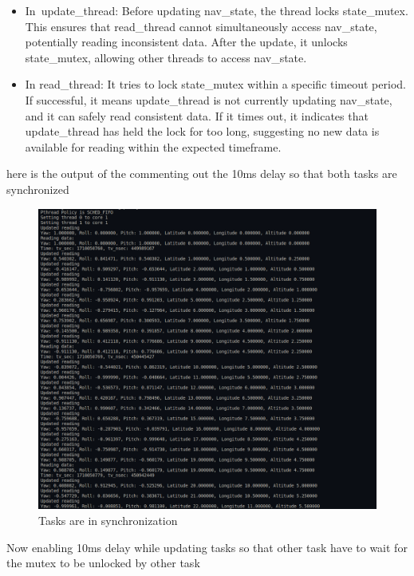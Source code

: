 \documentclass[a4paper,11pt]{article}%
\newenvironment{qanda}{\setlength{\parindent}{0pt}}{\bigskip}
\begin{document}
\begin{qanda}
\begin{enumerate}
\begin{enumerate}
\begin{itemize}
	\item In\ update\_thread: Before updating nav\_state, the thread locks state\_mutex. This ensures that read\_thread cannot simultaneously access nav\_state, potentially reading inconsistent data. After the update, it unlocks state\_mutex, allowing other threads to access nav\_state.
	\item 
	In read\_thread: It tries to lock state\_mutex within a specific timeout period. If successful, it means update\_thread is not currently updating nav\_state, and it can safely read consistent data. If it times out, it indicates that update\_thread has held the lock for too long, suggesting no new data is available for reading within the expected timeframe.	
\end{itemize}



here is the output of the commenting out the 10ms delay so that both tasks are synchronized

\begin{figure}[H]
	\centering
	\includegraphics[scale=0.6]{figures/pthread_working.png}
	\caption{Tasks are in synchronization}
\end{figure}


Now enabling 10ms delay while updating tasks so that other task have to wait for the mutex to be unlocked by other task


\end{enumerate}
\end{enumerate}
\end{qanda}
\end{document}
